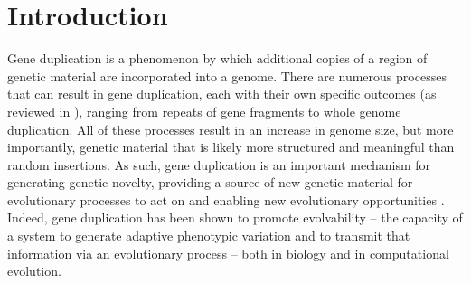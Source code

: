 \section{Introduction} \label{sec:introduction}

Gene duplication is a phenomenon by which
additional copies of a region of genetic material
are incorporated into a genome.
There are numerous processes that can result in gene duplication, each with their own specific outcomes (as reviewed in \citep{Zhang:2003fw}), ranging from repeats of gene fragments to whole genome duplication.  All of these processes result in %
an increase in genome size, but more importantly, genetic material that is likely more structured and meaningful than random insertions. %
As such, gene duplication is an important mechanism for generating genetic novelty, providing a source of new genetic material for evolutionary processes to act on and enabling new evolutionary opportunities \citep{Zhang:2003fw,Crow:2006role,Magadum:2013wu}. Indeed, gene duplication has been shown to promote evolvability -- the capacity of a system to generate adaptive phenotypic variation %
and to transmit that information via an evolutionary process \citep{Hu:2010ea} -- both in biology and in computational evolution.  %


